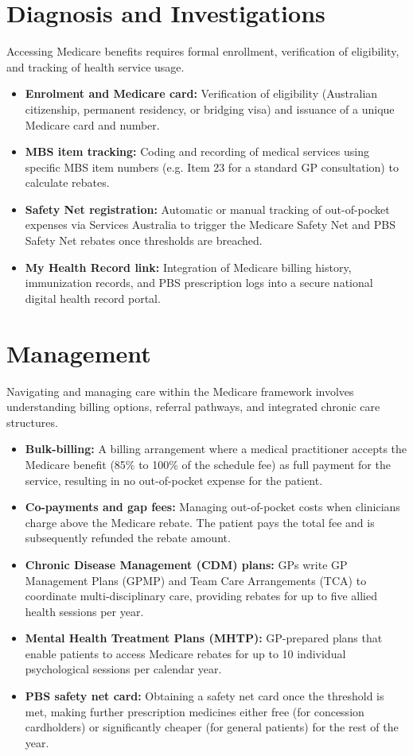 \section*{Diagnosis and Investigations}
Accessing Medicare benefits requires formal enrollment, verification of eligibility, and tracking of health service usage.
\begin{itemize}
    \item \textbf{Enrolment and Medicare card:} Verification of eligibility (Australian citizenship, permanent residency, or bridging visa) and issuance of a unique Medicare card and number.
    \item \textbf{MBS item tracking:} Coding and recording of medical services using specific MBS item numbers (e.g. Item 23 for a standard GP consultation) to calculate rebates.
    \item \textbf{Safety Net registration:} Automatic or manual tracking of out-of-pocket expenses via Services Australia to trigger the Medicare Safety Net and PBS Safety Net rebates once thresholds are breached.
    \item \textbf{My Health Record link:} Integration of Medicare billing history, immunization records, and PBS prescription logs into a secure national digital health record portal.
\end{itemize}

\section*{Management}
Navigating and managing care within the Medicare framework involves understanding billing options, referral pathways, and integrated chronic care structures.
\begin{itemize}
    \item \textbf{Bulk-billing:} A billing arrangement where a medical practitioner accepts the Medicare benefit (85\% to 100\% of the schedule fee) as full payment for the service, resulting in no out-of-pocket expense for the patient.
    \item \textbf{Co-payments and gap fees:} Managing out-of-pocket costs when clinicians charge above the Medicare rebate. The patient pays the total fee and is subsequently refunded the rebate amount.
    \item \textbf{Chronic Disease Management (CDM) plans:} GPs write GP Management Plans (GPMP) and Team Care Arrangements (TCA) to coordinate multi-disciplinary care, providing rebates for up to five allied health sessions per year.
    \item \textbf{Mental Health Treatment Plans (MHTP):} GP-prepared plans that enable patients to access Medicare rebates for up to 10 individual psychological sessions per calendar year.
    \item \textbf{PBS safety net card:} Obtaining a safety net card once the threshold is met, making further prescription medicines either free (for concession cardholders) or significantly cheaper (for general patients) for the rest of the year.
\end{itemize}

